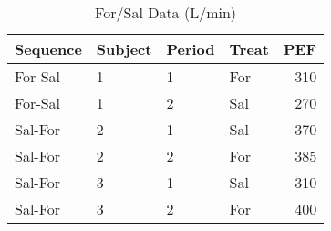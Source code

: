 \begin{table}

\caption{\label{tab:forSalData}For/Sal Data (L/min)}
\centering
\begin{tabular}[t]{llllr}
\toprule
Sequence & Subject & Period & Treat & PEF\\
\midrule
For-Sal & 1 & 1 & For & 310\\
For-Sal & 1 & 2 & Sal & 270\\
Sal-For & 2 & 1 & Sal & 370\\
Sal-For & 2 & 2 & For & 385\\
Sal-For & 3 & 1 & Sal & 310\\
\addlinespace
Sal-For & 3 & 2 & For & 400\\
\bottomrule
\end{tabular}
\end{table}
